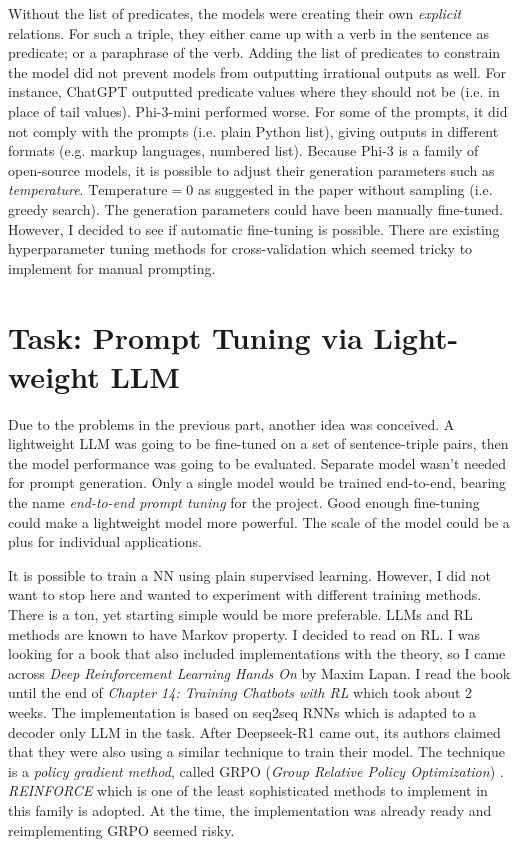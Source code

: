 \documentclass{article}
\begin{document}
Without the list of predicates, the models were creating their own \textit{explicit} relations. For such a triple, they either came up with a verb in the sentence as predicate; or a paraphrase of the verb. Adding the list of predicates to constrain the model did not prevent models from outputting irrational outputs as well. For instance, ChatGPT outputted predicate values where they should not be (i.e. in place of tail values). Phi-3-mini performed worse. For some of the prompts, it did not comply with the prompts (i.e. plain Python list), giving outputs in different formats (e.g. markup languages, numbered list). Because Phi-3 is a family of open-source models, it is possible to adjust their generation parameters such as \textit{temperature}. $\text{Temperature}=0$ as suggested in the paper without sampling (i.e. greedy search). The generation parameters could have been manually fine-tuned. However, I decided to see if automatic fine-tuning is possible. There are existing hyperparameter tuning methods for cross-validation which seemed tricky to implement for manual prompting.

\section{Task: Prompt Tuning via Light-weight LLM}

Due to the problems in the previous part, another idea was conceived. A lightweight LLM was going to be fine-tuned on a set of sentence-triple pairs, then the model performance was going to be evaluated. Separate model wasn't needed for prompt generation. Only a single model would be trained end-to-end, bearing the name \textit{end-to-end prompt tuning} for the project. Good enough fine-tuning could make a lightweight model more powerful. The scale of the model could be a plus for individual applications.

It is possible to train a NN using plain supervised learning. However, I did not want to stop here and wanted to experiment with different training methods. There is a ton, yet starting simple would be more preferable. LLMs and RL methods are known to have Markov property. I decided to read on RL. I was looking for a book that also included implementations with the theory, so I came across \textit{Deep Reinforcement Learning Hands On} by Maxim Lapan. I read the book until the end of \textit{Chapter 14: Training Chatbots with RL} which took about 2 weeks. The implementation is based on seq2seq RNNs which is adapted to a decoder only LLM in the task. After Deepseek-R1 came out, its authors claimed that they were also using a similar technique to train their model. The technique is a \textit{policy gradient method}, called GRPO (\textit{Group
Relative Policy Optimization}) \cite{deepseek-ai_deepseek-r1_2025, shao_deepseekmath_2024, schulman_proximal_2017}. \textit{REINFORCE} which is one of the least sophisticated methods to implement in this family is adopted. At the time, the implementation was already ready and reimplementing GRPO seemed risky.
\end{document}
